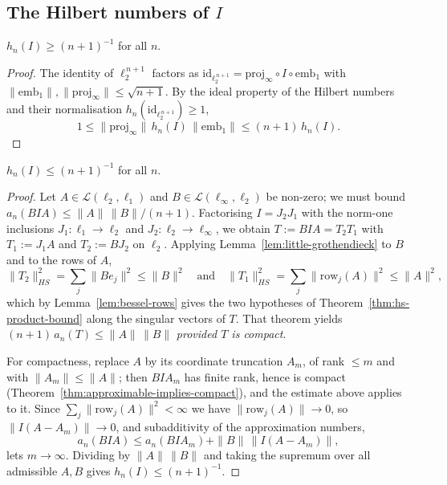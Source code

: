 \subsection{The Hilbert numbers of \texorpdfstring{$I$}{I}}
\label{sec:l1-linf-hilbert}

\begin{proposition}
\label{prop:l1-linf-hilbert-lower}
\leanok
$h_n(I) \ge (n+1)^{-1}$ for all $n$.
\end{proposition}
\begin{proof}
\leanok
{}
The identity of $\ell_2^{\,n+1}$ factors as
$\mathrm{id}_{\ell_2^{\,n+1}} = \mathrm{proj}_\infty \circ I \circ \mathrm{emb}_1$
with $\|\mathrm{emb}_1\|, \|\mathrm{proj}_\infty\| \le \sqrt{n+1}$. By the ideal
property of the Hilbert numbers and their normalisation
$h_n(\mathrm{id}_{\ell_2^{\,n+1}}) \ge 1$,
\[
  1 \le \|\mathrm{proj}_\infty\|\, h_n(I)\, \|\mathrm{emb}_1\| \le (n+1)\, h_n(I) .
\]
\end{proof}

\begin{theorem}
\label{thm:l1-linf-hilbert-upper}
\leanok
{}
$h_n(I) \le (n+1)^{-1}$ for all $n$.
\end{theorem}
\begin{proof}
\leanok
{}
Let $A \in \mathcal{L}(\ell_2, \ell_1)$ and $B \in \mathcal{L}(\ell_\infty,
\ell_2)$ be non-zero; we must bound $a_n(B I A) \le \|A\|\,\|B\|/(n+1)$.
Factorising $I = J_2 J_1$ with the norm-one inclusions
$J_1 \colon \ell_1 \to \ell_2$ and $J_2 \colon \ell_2 \to \ell_\infty$, we obtain
$T := B I A = T_2 T_1$ with $T_1 := J_1 A$ and $T_2 := B J_2$ on $\ell_2$.
Applying Lemma~\ref{lem:little-grothendieck} to $B$ and to the rows of $A$,
\[
  \|T_2\|_{HS}^2 = \sum_j \|B e_j\|^2 \le \|B\|^2
  \quad\text{and}\quad
  \|T_1\|_{HS}^2 = \sum_j \|\mathrm{row}_j(A)\|^2 \le \|A\|^2 ,
\]
which by Lemma~\ref{lem:bessel-rows} gives the two hypotheses of
Theorem~\ref{thm:hs-product-bound} along the singular vectors of $T$. That
theorem yields $(n+1)\, a_n(T) \le \|A\|\,\|B\|$ \emph{provided $T$ is compact}.

For compactness, replace $A$ by its coordinate truncation $A_m$, of rank
$\le m$ and with $\|A_m\| \le \|A\|$; then $B I A_m$ has finite rank, hence is
compact (Theorem~\ref{thm:approximable-implies-compact}), and the estimate above
applies to it. Since $\sum_j \|\mathrm{row}_j(A)\|^2 < \infty$ we have
$\|\mathrm{row}_j(A)\| \to 0$, so $\|I(A - A_m)\| \to 0$, and subadditivity of the
approximation numbers,
\[
  a_n(B I A) \le a_n(B I A_m) + \|B\|\,\|I(A - A_m)\| ,
\]
lets $m \to \infty$. Dividing by $\|A\|\,\|B\|$ and taking the supremum over all
admissible $A, B$ gives $h_n(I) \le (n+1)^{-1}$.
\end{proof}

